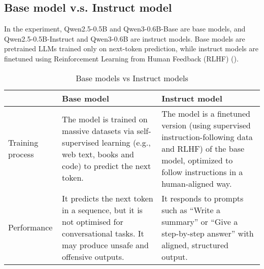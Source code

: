 \documentclass{article} %
\begin{document}
\subsection{Base model v.s. Instruct model}
In the experiment, Qwen2.5-0.5B and Qwen3-0.6B-Base are base models, and Qwen2.5-0.5B-Instruct and Qwen3-0.6B are instruct models. Base models are pretrained LLMs trained only on next-token prediction, while instruct models are finetuned using Reinforcement Learning from Human Feedback (RLHF) (\cite{ouyang2022training}). 
\begin{table}[H]
  \centering
  \begin{tabular}{|p{3cm}|p{5cm}|p{5cm}|}
    \hline
    & Base model& Instruct model\\ \hline
    Training process& The model is trained on massive datasets via self-supervised learning (e.g., web text, books and code) to predict the next token.& The model is a finetuned version (using supervised instruction-following data and RLHF) of the base model, optimized to follow instructions in a human-aligned way.\\ \hline
    Performance& It predicts the next token in a sequence, but it is not optimised for conversational tasks. It may produce unsafe and offensive outputs.& It responds to prompts such as  “Write a summary” or “Give a step-by-step answer” with aligned, structured output.\\ \hline
  \end{tabular}
  \caption{Base models vs Instruct models}
  \label{tab:your_label}
\end{table}





\end{document}
